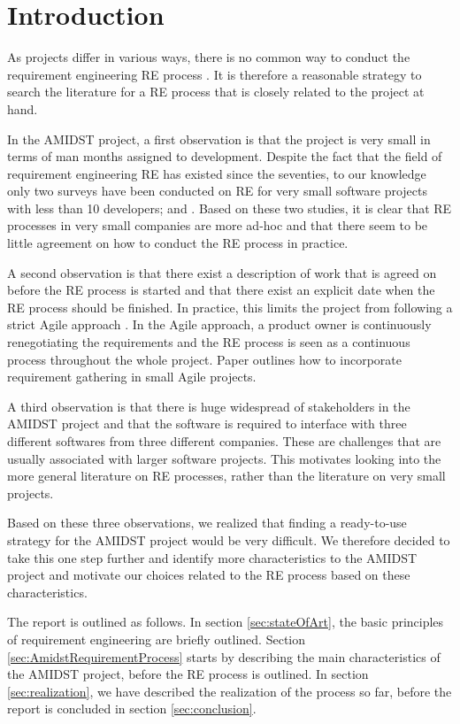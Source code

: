 \section{Introduction}

As projects differ in various ways, there is no common way to conduct the requirement engineering RE process
\cite{Poh10}.  It is therefore a reasonable strategy to search the literature for a RE process that is closely related
to the project at hand.   

In the AMIDST project, a first observation is that the project is very small in terms of man months assigned to
development.  Despite the fact that the field of requirement engineering RE has existed since the seventies, to our
knowledge only two surveys have been conducted on RE for very small software projects with less than 10 developers;
\cite{Qui10} and \cite{Ara07}.  Based on these two studies, it is clear that RE processes in very small companies are
more ad-hoc and that there seem to be little agreement on how to conduct the RE process in practice. 

A second observation is that there exist a description of work that is agreed on before the RE process is started and
that there exist an explicit date when the RE process should be finished.  In practice, this limits the project from
following a strict Agile approach \cite{Din10}.  In the Agile approach, a product owner is continuously renegotiating
the requirements and the RE process is seen as a continuous process throughout the whole project.  Paper \cite{Kav11}
outlines how to incorporate requirement gathering in small Agile projects.   

A third observation is that there is huge widespread of stakeholders in the AMIDST project and that the software is
required to interface with three different softwares from three different companies.  These are challenges that are
usually associated with larger software projects.  This motivates looking into the more general literature on RE
processes, rather than the literature on very small projects.  

Based on these three observations, we realized that finding a ready-to-use strategy for the AMIDST project would be very
difficult.  We therefore decided to take this one step further and identify more characteristics to the AMIDST project
and motivate our choices related to the RE process based on these characteristics.  

The report is outlined as follows.  In section \ref{sec:stateOfArt}, the basic principles of requirement engineering are
briefly outlined.  Section \ref{sec:AmidstRequirementProcess} starts by describing the main characteristics of the
AMIDST project, before the RE process is outlined.  In section \ref{sec:realization}, we have described the realization
of the process so far, before the report is concluded in section \ref{sec:conclusion}. 
